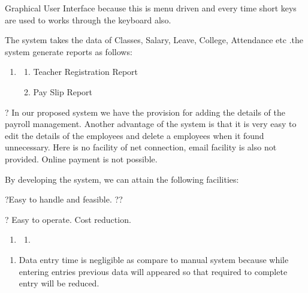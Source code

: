 \documentclass{article} %
\begin{document}
\noindent Graphical User Interface because this is menu driven and every time short keys are used to works through the keyboard also. 

\noindent The system takes the data of Classes, Salary, Leave, College, Attendance etc .the system generate reports as follows: 

\begin{enumerate}
\item \begin{enumerate}
\item  Teacher Registration Report 

\item  Pay Slip Report 
\end{enumerate}
\end{enumerate}

\noindent 

\noindent ? In our proposed system we have the provision for adding the details of the payroll management. Another advantage of the system is that it is very easy to edit the details of the employees and delete a employees when it found unnecessary. Here is no facility of net connection, email facility is also not provided. Online payment is not possible. 

\noindent 

\noindent By developing the system, we can attain the following facilities:

\noindent 

\noindent ?Easy to handle and feasible. ??

\noindent ? Easy to operate. Cost reduction. 

\noindent 

\begin{enumerate}
\item \begin{enumerate}
\item  \textbf{}\underbar{}
\end{enumerate}
\end{enumerate}

\noindent 

\begin{enumerate}
\item  Data entry time is negligible as compare to manual system because while entering entries previous data will appeared so that required to complete entry will be reduced. 
\end{enumerate}

\noindent 
\end{document}
